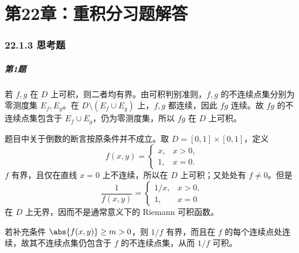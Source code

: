 
\chapter*{第22章：重积分习题解答}
\subsection*{22.1.3 思考题}

\paragraph{第1题}
\begin{xsolution}
若 $f,g$ 在 $D$ 上可积，则二者均有界。由可积判别准则，$f,g$ 的不连续点集分别为零测度集 $E_f,E_g$。在 $D\setminus(E_f\cup E_g)$ 上，$f,g$ 都连续，因此 $fg$ 连续。故 $fg$ 的不连续点集包含于 $E_f\cup E_g$，仍为零测度集，所以 $fg$ 在 $D$ 上可积。

题目中关于倒数的断言按原条件并不成立。取 $D=[0,1]\times[0,1]$，定义
\[
  f(x,y)=
  \begin{cases}
    x,&x>0,\\
    1,&x=0.
  \end{cases}
\]
$f$ 有界，且仅在直线 $x=0$ 上不连续，所以在 $D$ 上可积；又处处有 $f\ne0$。但是
\[
  \frac1{f(x,y)}=
  \begin{cases}
    1/x,&x>0,\\
    1,&x=0
  \end{cases}
\]
在 $D$ 上无界，因而不是通常意义下的 Riemann 可积函数。

若补充条件 $\abs{f(x,y)}\ge m>0$，则 $1/f$ 有界，而且在 $f$ 的每个连续点处连续，故其不连续点集仍包含于 $f$ 的不连续点集，从而 $1/f$ 可积。
\end{xsolution}

